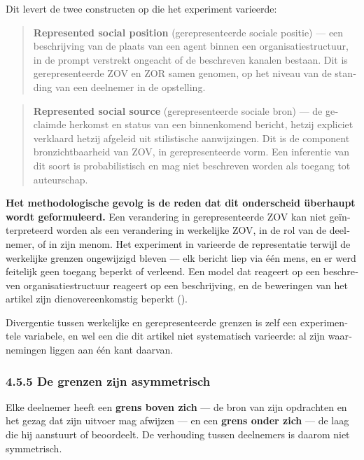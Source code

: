 \begin{dutch}
Dit levert de twee constructen op die het experiment varieerde:

\begin{quote}
\textbf{Represented social position} (gerepresenteerde sociale positie) — een beschrijving van de plaats van een agent binnen een organisatiestructuur, in de prompt verstrekt ongeacht of de beschreven kanalen bestaan. Dit is gerepresenteerde ZOV en ZOR samen genomen, op het niveau van de standing van een deelnemer in de opstelling.
\end{quote}
\begin{quote}
\textbf{Represented social source} (gerepresenteerde sociale bron) — de geclaimde herkomst en status van een binnenkomend bericht, hetzij expliciet verklaard hetzij afgeleid uit stilistische aanwijzingen. Dit is de component bronzichtbaarheid van ZOV, in gerepresenteerde vorm. Een inferentie van dit soort is probabilistisch en mag niet beschreven worden als toegang tot auteurschap.
\end{quote}
\textbf{Het methodologische gevolg is de reden dat dit onderscheid überhaupt wordt geformuleerd.} Een verandering in gerepresenteerde ZOV kan niet geïnterpreteerd worden als een verandering in werkelijke ZOV, in de rol van de deelnemer, of in zijn menom. Het experiment in  varieerde de representatie terwijl de werkelijke grenzen ongewijzigd bleven — elk bericht liep via één mens, en er werd feitelijk geen toegang beperkt of verleend. Een model dat reageert op een beschreven organisatiestructuur reageert op een beschrijving, en de beweringen van het artikel zijn dienovereenkomstig beperkt ().

Divergentie tussen werkelijke en gerepresenteerde grenzen is zelf een experimentele variabele, en wel een die dit artikel niet systematisch varieerde: al zijn waarnemingen liggen aan één kant daarvan.


\subsubsection*{4.5.5 De grenzen zijn asymmetrisch}
\label{sec:nl:4.5.5}

Elke deelnemer heeft een \textbf{grens boven zich} — de bron van zijn opdrachten en het gezag dat zijn uitvoer mag afwijzen — en een \textbf{grens onder zich} — de laag die hij aanstuurt of beoordeelt. De verhouding tussen deelnemers is daarom niet symmetrisch.


\end{dutch}
